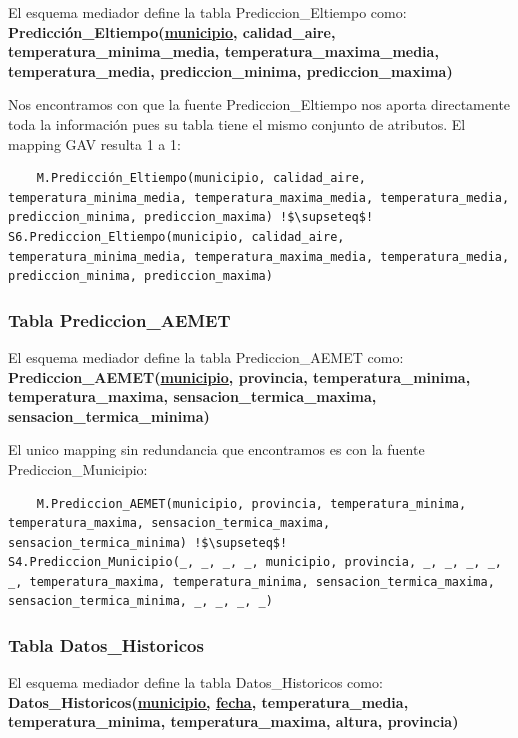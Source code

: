 \documentclass[12pt, a4paper]{article}
\begin{document}
El esquema mediador define la tabla Prediccion\_Eltiempo como:\\
\textbf{Predicción\_Eltiempo(\underline{municipio}, calidad\_aire, temperatura\_minima\_media, temperatura\_maxima\_media, temperatura\_media, prediccion\_minima, prediccion\_maxima)}

Nos encontramos con que la fuente Prediccion\_Eltiempo nos aporta directamente toda la información pues su tabla tiene el mismo conjunto de atributos. El mapping GAV resulta 1 a 1:
\begin{lstlisting}
    M.Predicción_Eltiempo(municipio, calidad_aire, temperatura_minima_media, temperatura_maxima_media, temperatura_media, prediccion_minima, prediccion_maxima) !$\supseteq$!
S6.Prediccion_Eltiempo(municipio, calidad_aire, temperatura_minima_media, temperatura_maxima_media, temperatura_media, prediccion_minima, prediccion_maxima)
\end{lstlisting}

\subsubsection{Tabla Prediccion\_AEMET}

El esquema mediador define la tabla Prediccion\_AEMET como:\\
\textbf{Prediccion\_AEMET(\underline{municipio}, provincia, temperatura\_minima, temperatura\_maxima, sensacion\_termica\_maxima, sensacion\_termica\_minima)}

El unico mapping sin redundancia que encontramos es con la fuente Prediccion\_Municipio:
\begin{lstlisting}
    M.Prediccion_AEMET(municipio, provincia, temperatura_minima, temperatura_maxima, sensacion_termica_maxima, sensacion_termica_minima) !$\supseteq$!
S4.Prediccion_Municipio(_, _, _, _, municipio, provincia, _, _, _, _, _, temperatura_maxima, temperatura_minima, sensacion_termica_maxima, sensacion_termica_minima, _, _, _, _)
\end{lstlisting}

\subsubsection{Tabla Datos\_Historicos}

El esquema mediador define la tabla Datos\_Historicos como:\\
\textbf{Datos\_Historicos(\underline{municipio,} \underline{fecha,} temperatura\_media, temperatura\_minima, temperatura\_maxima, altura, provincia)}
\end{document}
